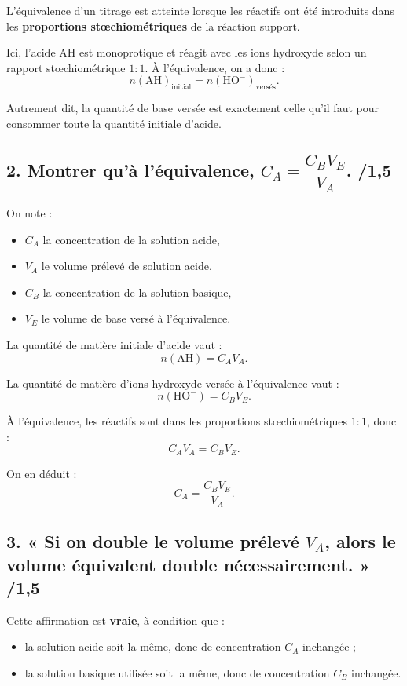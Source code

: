 \documentclass[11pt,a4paper]{article}
\begin{document}
L'équivalence d'un titrage est atteinte lorsque les réactifs ont été introduits dans les \textbf{proportions stœchiométriques} de la réaction support.

Ici, l'acide AH est monoprotique et réagit avec les ions hydroxyde selon un rapport stœchiométrique \(1:1\). À l'équivalence, on a donc :
\[
n(\mathrm{AH})_{\text{initial}} = n(\mathrm{HO^-})_{\text{versés}}.
\]

Autrement dit, la quantité de base versée est exactement celle qu'il faut pour consommer toute la quantité initiale d'acide.

\subsection*{2. Montrer qu'à l'équivalence, \(C_A = \dfrac{C_BV_E}{V_A}\). \hfill /1{,}5}

On note :
\begin{itemize}
    \item \(C_A\) la concentration de la solution acide,
    \item \(V_A\) le volume prélevé de solution acide,
    \item \(C_B\) la concentration de la solution basique,
    \item \(V_E\) le volume de base versé à l'équivalence.
\end{itemize}

La quantité de matière initiale d'acide vaut :
\[
n(\mathrm{AH}) = C_A V_A.
\]

La quantité de matière d'ions hydroxyde versée à l'équivalence vaut :
\[
n(\mathrm{HO^-}) = C_B V_E.
\]

À l'équivalence, les réactifs sont dans les proportions stœchiométriques \(1:1\), donc :
\[
C_A V_A = C_B V_E.
\]

On en déduit :
\[
\boxed{C_A = \frac{C_BV_E}{V_A}}.
\]

\subsection*{3. « Si on double le volume prélevé \(V_A\), alors le volume équivalent double nécessairement. » \hfill /1{,}5}

Cette affirmation est \textbf{vraie}, à condition que :
\begin{itemize}
    \item la solution acide soit la même, donc de concentration \(C_A\) inchangée ;
    \item la solution basique utilisée soit la même, donc de concentration \(C_B\) inchangée.
\end{itemize}
\end{document}
